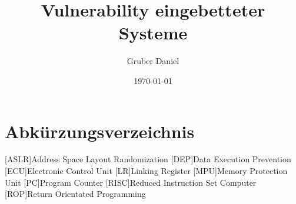 \documentclass[a4paper,
DIV=13,
12pt,
BCOR=10mm,
department=FakIM,
oneside,
parskip=half,
automark,
listof=totocnumbered,
bibliography=totocnumbered,
acronym=totocnumbered
] {OTHRartcl}
\date{\today}
\title{Vulnerability eingebetteter Systeme}
\author{Gruber Daniel}
\begin{document}
\maketitle

\tableofcontents
\newpage

\section*{Abkürzungsverzeichnis}
\label{abkuerzungsverzeichnis}
\begin{acronym}[AUTOSAR]
  [ASLR]{Address Space Layout Randomization}
  [DEP]{Data Execution Prevention}
  [ECU]{Electronic Control Unit}
  [LR]{Linking Register}
  [MPU]{Memory Protection Unit}
  [PC]{Program Counter}
  [RISC]{Reduced Instruction Set Computer}
  [ROP]{Return Orientated Programming}
\end{acronym}
\newpage

\end{document}
